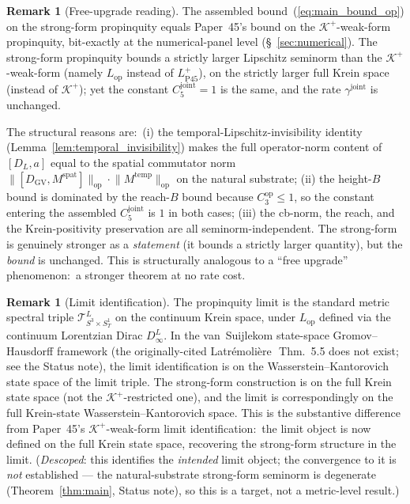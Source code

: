 \documentclass[11pt,a4paper]{article}
\theoremstyle{plain}
\theoremstyle{definition}
\newtheorem{remark}[theorem]{Remark}
\newcommand{\Manifold}{S^{3}\times S^{1}_{T}}
\newcommand{\Krein}{\mathcal{K}}
\newcommand{\Tcal}{\mathcal{T}}
\newcommand{\opnorm}[1]{\lVert #1 \rVert_{\mathrm{op}}}
\newcommand{\DGV}{D_{\mathrm{GV}}}
\newcommand{\DL}{D_{L}}
\newcommand{\Lop}{L_{\mathrm{op}}}
\newcommand{\LPwk}{L^{+}_{\mathrm{P45}}}
\newcommand{\gammajoint}{\gamma^{\mathrm{joint}}}
\newcommand{\Cthreeop}{C_{3}^{\mathrm{op}}}
\newcommand{\Cfivejoint}{C_{5}^{\mathrm{joint}}}
\newcommand{\Kplus}{\Krein^{+}}
\newcommand{\spat}{\mathrm{spat}}
\newcommand{\temp}{\mathrm{temp}}
\begin{document}
\begin{remark}[Free-upgrade reading]\label{rem:free_upgrade}
The assembled bound~(\ref{eq:main_bound_op}) on the strong-form
propinquity equals Paper~45's bound on the $\Kplus$-weak-form
propinquity, bit-exactly at the numerical-panel level (\S~\ref{sec:numerical}).
The strong-form propinquity bounds a strictly larger Lipschitz
seminorm than the $\Kplus$-weak-form (namely $\Lop$ instead of
$\LPwk$), on the strictly larger full Krein space (instead of $\Kplus$);
yet the constant $\Cfivejoint = 1$ is the same, and the rate
$\gammajoint$ is unchanged.

The structural reasons are:\ (i) the temporal-Lipschitz-invisibility
identity (Lemma~\ref{lem:temporal_invisibility}) makes the full
operator-norm content of $[\DL, a]$ equal to the spatial commutator
norm $\opnorm{[\DGV, M^{\spat}]} \cdot \opnorm{M^{\temp}}$ on the
natural substrate; (ii) the height-$B$ bound is dominated by the
reach-$B$ bound because $\Cthreeop \le 1$, so the constant entering
the assembled $\Cfivejoint$ is $1$ in both cases; (iii) the cb-norm,
the reach, and the Krein-positivity preservation are all
seminorm-independent. The strong-form is genuinely stronger as a
\emph{statement} (it bounds a strictly larger quantity), but the
\emph{bound} is unchanged. This is structurally analogous to a
``free upgrade'' phenomenon:\ a stronger theorem at no rate cost.
\end{remark}

\begin{remark}[Limit identification]\label{rem:limit_identification_op}
The propinquity limit is the standard metric spectral triple
$\Tcal^{L}_{\Manifold}$ on the continuum Krein space, under $\Lop$
defined via the continuum Lorentzian Dirac $D^{L}_{\infty}$. In the
van~Suijlekom state-space Gromov--Hausdorff framework (the
originally-cited Latr\'emoli\`ere~\cite{latremoliere_metric_st_2017}\,Thm.~5.5
does not exist; see the Status note), the limit
identification is on the Wasserstein--Kantorovich state space of the
limit triple. The strong-form construction is on the full Krein
state space (not the $\Kplus$-restricted one), and the limit is
correspondingly on the full Krein-state Wasserstein--Kantorovich space.
This is the substantive difference from Paper~45's $\Kplus$-weak-form
limit identification:\ the limit object is now defined on the full
Krein state space, recovering the strong-form structure in the limit.
(\emph{Descoped}: this identifies the \emph{intended} limit object; the
convergence to it is \emph{not} established --- the natural-substrate
strong-form seminorm is degenerate (Theorem~\ref{thm:main}, Status note),
so this is a target, not a metric-level result.)
\end{remark}
\end{document}
